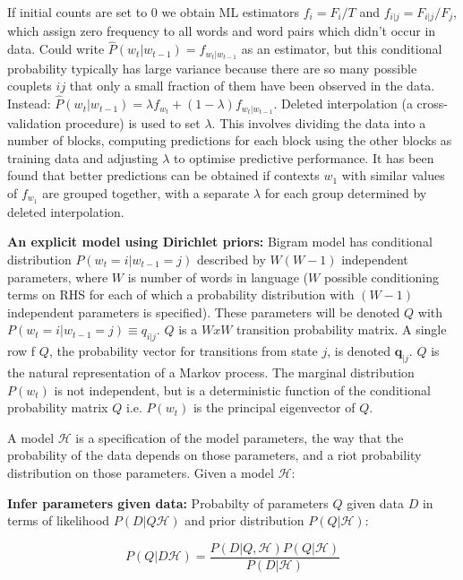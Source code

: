 If initial counts are set to 0 we obtain ML estimators $f_{i}=F_{i}/T$ and $f_{i|j}=F_{i|j}/F_{j}$, which assign zero frequency to all words and word pairs which didn't occur in data. Could write $\hat{P}(w_{t}|w_{t-1})=f_{w_{t}|w_{t-1}}$ as an estimator, but this conditional probability typically has large variance because there are so many possible couplets $ij$ that only a small fraction of them have been observed in the data. Instead: $\hat{P}(w_{t}|w_{t-1})=\lambda f_{w_{t}}+(1-\lambda)f_{w_{t}|w_{t-1}}$. Deleted interpolation (a cross-validation procedure) is used to set $\lambda$. This involves dividing the data into a number of blocks, computing predictions for each block using the other blocks as training data and adjusting $\lambda$ to optimise predictive performance. It has been found that better predictions can be obtained if contexts $w_{1}$ with similar values of $f_{w_{1}}$ are grouped together, with a separate $\lambda$ for each group determined by deleted interpolation.

\textbf{An explicit model using Dirichlet priors: } Bigram model has conditional distribution $P(w_{t}=i|w_{t-1}=j)$ described by $W(W-1)$ independent parameters, where $W$ is number of words in language ($W$ possible conditioning terms on RHS for each of which a probability distribution with $(W-1)$ independent parameters is specified). These parameters will be denoted $Q$ with $P(w_{t}=i|w_{t-1}=j)\equiv q_{i|j}$. $Q$ is a $WxW$ transition probability matrix. A single row f $Q$, the probability vector for transitions from state $j$, is denoted $\boldsymbol{q}_{|j}$. $Q$ is the natural representation of a Markov process. The marginal distribution $P(w_{t})$ is not independent, but is a deterministic function of the conditional probability matrix $Q$ i.e. $P(w_{t})$ is the principal eigenvector of $Q$. 

A model $\mathscr{H}$ is a specification of the model parameters, the way that the probability of the data depends on those parameters, and a riot probability distribution on those parameters. Given a model $\mathscr{H}$:

\textbf{Infer parameters given data: } Probabilty of parameters $Q$ given data $D$ in terms of likelihood $P(D|Q\mathscr{H})$ and prior distribution $P(Q|\mathscr{H})$:

\begin{equation}
P(Q|D\mathscr{H})=\frac{P(D|Q, \mathscr{H})P(Q|\mathscr{H})}{P(D|\mathscr{H})}
\end{equation}

